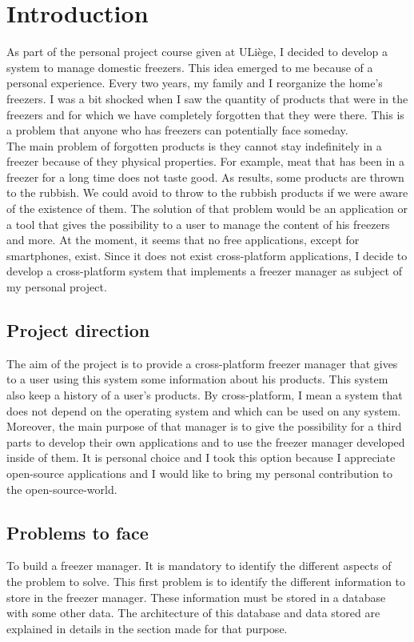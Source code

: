 \section{Introduction}
As part of the personal project course given at ULiège, I decided to develop a system to manage domestic freezers. This idea emerged to me because of a personal experience. Every two years, my family and I reorganize the home's freezers. I was a bit shocked when I saw the quantity of products that were in the freezers and for which we have completely forgotten that they were there. This is a problem that anyone who has freezers can potentially face someday. \\

The main problem of forgotten products is they cannot stay indefinitely in a freezer because of they physical properties. For example, meat that has been in a freezer for a long time does not taste good. As results, some products are thrown to the rubbish. We could avoid to throw to the rubbish products if we were aware of the existence of them. The solution of that problem would be an application or a tool that gives the possibility to a user to manage the content of his freezers and more. At the moment, it seems that no free applications, except for smartphones, exist. Since it does not exist cross-platform applications, I decide to develop a cross-platform system that implements a freezer manager as subject of my personal project.

\subsection{Project direction}
The aim of the project is to provide a cross-platform freezer manager that gives to a user using this system some information about his products. This system also keep a history of a user's products. By cross-platform, I mean a system that does not depend on the operating system and which can be used on any system. Moreover, the main purpose of that manager is to give the possibility for a third parts to develop their own applications and to use the freezer manager developed inside of them. It is personal choice and I took this option because I appreciate open-source applications and I would like to bring my personal contribution to the open-source-world. \\

\subsection{Problems to face}
To build a freezer manager. It is mandatory to identify the different aspects of the problem to solve. This first problem is to identify the different information to store in the freezer manager. These information must be stored in a database with some other data. The architecture of this database and data stored are explained in details in the section made for that purpose.\\

